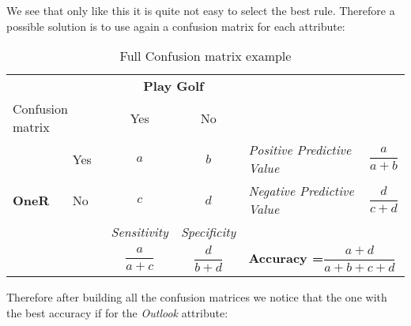 	We see that only like this it is quite not easy to select the best rule. Therefore a possible solution is to use again a confusion matrix for each attribute:
	\begin{table}[H]
		\centering
		\begin{tabular}{|l|l|c|c|l|l|}
		\hline
		\multicolumn{2}{|l|}{\cellcolor[HTML]{FFFFFF}} & \multicolumn{2}{c|}{\cellcolor[HTML]{C0C0C0}\textbf{Play Golf}} & \multicolumn{2}{l|}{} \\ \cline{3-4}
		\multicolumn{2}{|l|}{\multirow{-2}{*}{\cellcolor[HTML]{FFFFFF}Confusion matrix}} & \cellcolor[HTML]{C0C0C0}Yes & \cellcolor[HTML]{C0C0C0}No & \multicolumn{2}{l|}{\multirow{-2}{*}{}} \\ \hline
		\cellcolor[HTML]{C0C0C0} & \cellcolor[HTML]{C0C0C0}Yes & $a$ & $b$ & \cellcolor[HTML]{FFFFC7}\textit{Positive Predictive Value} & \cellcolor[HTML]{FFFFC7}$\dfrac{a}{a+b}$ \\ \cline{2-6} 
		\multirow{-2}{*}{\cellcolor[HTML]{C0C0C0}\textbf{OneR}} & \cellcolor[HTML]{C0C0C0}No & $c$ & $d$ & \cellcolor[HTML]{FFFFC7}\textit{Negative Predictive Value} & \cellcolor[HTML]{FFFFC7}$\dfrac{d}{c+d}$ \\ \hline
		\multicolumn{2}{|l|}{} & \cellcolor[HTML]{FFFFC7}\textit{Sensitivity} & \cellcolor[HTML]{FFFFC7}\textit{Specificity} & \multicolumn{2}{l|}{} \\ \cline{3-4}
		\multicolumn{2}{|l|}{\multirow{-2}{*}{}} & \cellcolor[HTML]{FFFFC7}$\dfrac{a}{a+c}$ & \cellcolor[HTML]{FFFFC7}$\dfrac{d}{b+d}$ & \multicolumn{2}{l|}{\multirow{-2}{*}{\textbf{Accuracy =}$\dfrac{a+d}{a+b+c+d}$}} \\ \hline
		\end{tabular}
		\caption{Full Confusion matrix example}
	\end{table}
	Therefore after building all the confusion matrices we notice that the one with the best accuracy if for the \textit{Outlook} attribute:
